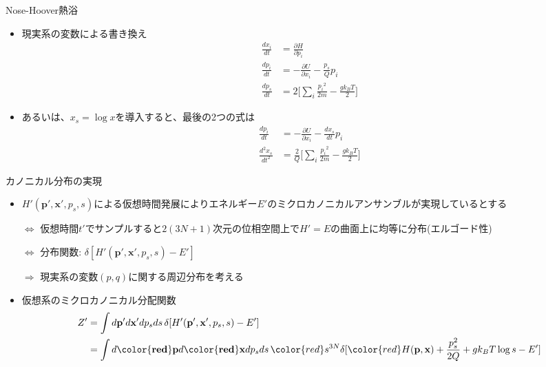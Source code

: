 \documentclass[dvipdfmx]{beamer}
\begin{document}
\begin{frame}[t,fragile]{Nose-Hoover熱浴}
  \begin{itemize}
  \item 現実系の変数による書き換え
    \begin{align*}
      \frac{dx_i}{dt} &= \frac{\partial H}{\partial p_i} \\
      \frac{dp_i}{dt} &= -\frac{\partial U}{\partial x_i} -\frac{p_s}{Q} p_i \\
      \frac{dp_s}{dt} &= 2 \big[ \sum_i \frac{{p_i}^2}{2m} - \frac{g k_B T}{2} \big]
    \end{align*}
  \item あるいは、$x_s = \log x$を導入すると、最後の2つの式は
    \begin{align*}
      \frac{dp_i}{dt} &= -\frac{\partial U}{\partial x_i} -\frac{dx_s}{dt} p_i \\
      \frac{d^2x_s}{dt^2} &= \frac{2}{Q} \big[ \sum_i \frac{{p_i}^2}{2m} - \frac{g k_B T}{2} \big]
    \end{align*}
  \end{itemize}
\end{frame}

\begin{frame}[t,fragile]{カノニカル分布の実現}
  \begin{itemize}
  \item $H'(\mathbf{p}',\mathbf{x}',p_s,s)$による仮想時間発展によりエネルギー$E'$のミクロカノニカルアンサンブルが実現しているとする

    $\Leftrightarrow$ 仮想時間$t'$でサンプルすると$2(3N+1)$次元の位相空間上で$H'=E$の曲面上に均等に分布(エルゴード性)
    
    $\Leftrightarrow$ 分布関数: $\delta [ H'(\mathbf{p}',\mathbf{x}',p_s,s) - E']$
    
    $\Rightarrow$ 現実系の変数$(p,q)$に関する周辺分布を考える
  \item 仮想系のミクロカノニカル分配関数
    \begin{align*}
      Z'&=\int d\mathbf{p}' d\mathbf{x}' dp_s ds \, \delta [ H'(\mathbf{p}',\mathbf{x}',p_s,s) - E'] \\
      &=\int d\mathbf{{\color{red}p}} d\mathbf{{\color{red}x}} dp_s ds \, {\color{red}s^{3N}} \delta [ {\color{red}H(\mathbf{p},\mathbf{x})} + \frac{p_s^2}{2Q} + g k_B T \log s - E']
    \end{align*}
  \end{itemize}
\end{frame}
\end{document}
